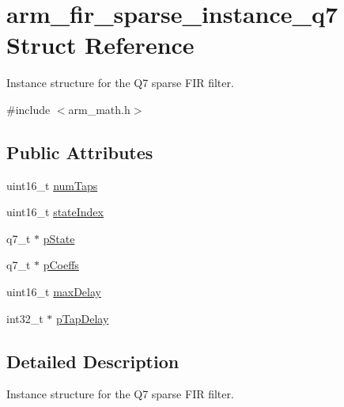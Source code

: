 \hypertarget{structarm__fir__sparse__instance__q7}{\section{arm\-\_\-fir\-\_\-sparse\-\_\-instance\-\_\-q7 Struct Reference}
\label{structarm__fir__sparse__instance__q7}
}


Instance structure for the Q7 sparse F\-I\-R filter.  




{\ttfamily \#include $<$arm\-\_\-math.\-h$>$}

\subsection*{Public Attributes}
\begin{DoxyCompactItemize}
\item 
uint16\-\_\-t \hyperlink{structarm__fir__sparse__instance__q7_a54cdd27ca1c672b126c38763ce678b1c}{num\-Taps}
\item 
uint16\-\_\-t \hyperlink{structarm__fir__sparse__instance__q7_a2d2e65473fe3a3f2b953b4e0b60824df}{state\-Index}
\item 
q7\-\_\-t $\ast$ \hyperlink{structarm__fir__sparse__instance__q7_a18072cf3ef3666d588f0d49512f2b28f}{p\-State}
\item 
q7\-\_\-t $\ast$ \hyperlink{structarm__fir__sparse__instance__q7_a3dac86f15e33553e8f3e19e0d712bae5}{p\-Coeffs}
\item 
uint16\-\_\-t \hyperlink{structarm__fir__sparse__instance__q7_af74dacc1d34c078283e50f2530eb91df}{max\-Delay}
\item 
int32\-\_\-t $\ast$ \hyperlink{structarm__fir__sparse__instance__q7_ac625393c84bc0342ffdf26fc4eba1ac1}{p\-Tap\-Delay}
\end{DoxyCompactItemize}


\subsection{Detailed Description}
Instance structure for the Q7 sparse F\-I\-R filter. 

